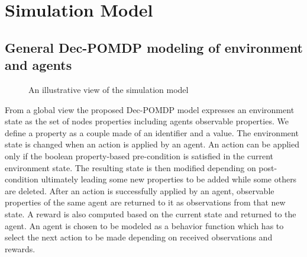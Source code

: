 \documentclass[conference]{IEEEtran}
\newcommand{\rem}[1]{\textcolor{red}{#1}}
\begin{document}
\section{Simulation Model}

\subsection{General Dec-POMDP modeling of environment and agents}


\begin{figure*}[]
    \centering
    
    \caption{An illustrative view of the simulation model}
    \label{fig:model_example_illustration}
\end{figure*}

\noindent
From a global view the proposed Dec-POMDP model expresses an environment state as the set of nodes properties including agents observable properties. We define a property as a couple made of an identifier and a value. The environment state is changed when an action is applied by an agent. An action can be applied only if the boolean property-based pre-condition is satisfied in the current environment state. The resulting state is then modified depending on post-condition ultimately leading some new properties to be added while some others are deleted. After an action is successfully applied by an agent, observable properties of the same agent are returned to it as observations from that new state. A reward is also computed based on the current state and returned to the agent. An agent is chosen to be modeled as a behavior function which has to select the next action to be made depending on received observations and rewards.
\end{document}
